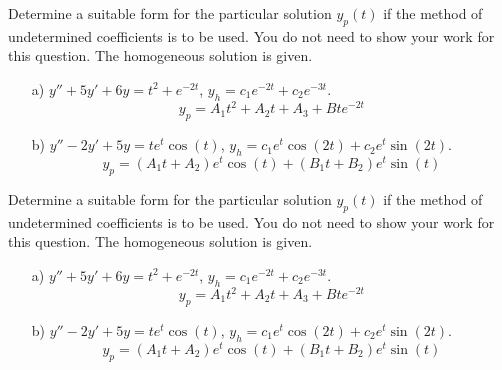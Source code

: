 \ifnum {}
\question[4] 
Determine a suitable form for the particular solution $y_p(t)$ if the method of undetermined coeﬃcients is to be used. You do not need to show your work for this question. The homogeneous solution is given. 
\begin{enumerate}
    \item[a)] $y''+5y'+6y = t^2+e^{-2t}$, $y_h = c_1e^{-2t} + c_2 e^{-3t}$. 
    \ifnum {} {\color{DarkBlue} \\
    $$y_p = A_1t^2+A_2t+A_3 + Bte^{-2t}$$
    } 
    \else 
    \vspace{2cm}
    \fi
    \item[b)] $y'' - 2y' + 5y =  te^t\cos(t)$, $y_h = c_1e^{t}\cos(2t) + c_2 e^{t}\sin(2t)$. 
    \ifnum {} {\color{DarkBlue} \\
    $$y_p =  (A_1t+A_2)e^{t}\cos(t) +  (B_1t+B_2)e^{t}\sin(t) $$
    } 
    \else 
    \vspace{2cm}
    \fi        
\end{enumerate}
\fi



\ifnum {}
\question[4] 
Determine a suitable form for the particular solution $y_p(t)$ if the method of undetermined coeﬃcients is to be used. You do not need to show your work for this question. The homogeneous solution is given. 
\begin{enumerate}
    \item[a)] $y''+5y'+6y = t^2+e^{-2t}$, $y_h = c_1e^{-2t} + c_2 e^{-3t}$. 
    \ifnum {} {\color{DarkBlue} \\
    $$y_p = A_1t^2+A_2t+A_3 + Bte^{-2t}$$
    } 
    \else 
    \vspace{2cm}
    \fi
    \item[b)] $y'' - 2y' + 5y =  te^t\cos(t)$, $y_h = c_1e^{t}\cos(2t) + c_2 e^{t}\sin(2t)$. 
    \ifnum {} {\color{DarkBlue} \\
    $$y_p =  (A_1t+A_2)e^{t}\cos(t) +  (B_1t+B_2)e^{t}\sin(t) $$
    } 
    \else 
    \vspace{2cm}
    \fi        
\end{enumerate}
\fi



